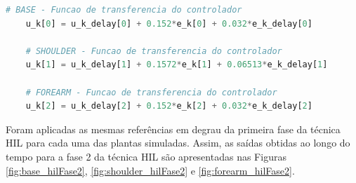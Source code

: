 \begin{lstlisting}[language=Python]
	# BASE - Funcao de transferencia do controlador
	u_k[0] = u_k_delay[0] + 0.152*e_k[0] + 0.032*e_k_delay[0]

	# SHOULDER - Funcao de transferencia do controlador
	u_k[1] = u_k_delay[1] + 0.1572*e_k[1] + 0.06513*e_k_delay[1]

	# FOREARM - Funcao de transferencia do controlador
	u_k[2] = u_k_delay[2] + 0.152*e_k[2] + 0.032*e_k_delay[2]
\end{lstlisting}

Foram aplicadas as mesmas referências em degrau da primeira fase da técnica HIL para 
cada uma das plantas simuladas. Assim, as saídas obtidas ao longo do tempo para 
a fase 2 da técnica HIL são apresentadas nas Figuras \ref{fig:base_hilFase2}, 
\ref{fig:shoulder_hilFase2} e \ref{fig:forearm_hilFase2}.

\newpage

